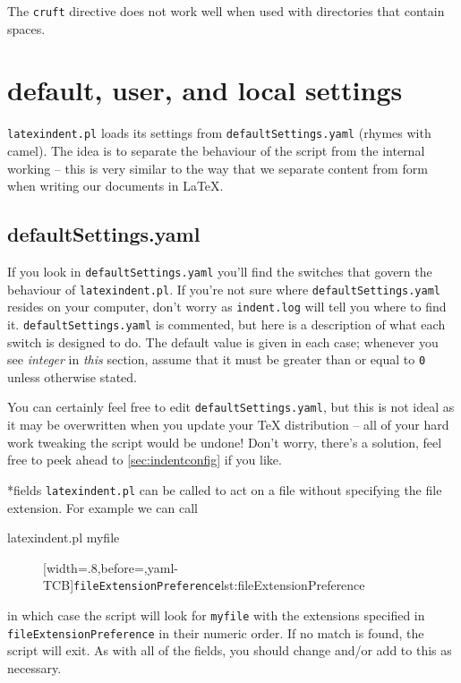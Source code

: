 \documentclass[10pt]{article}
\begin{document}
The \texttt{cruft} directive does not work well when used with
directories that contain spaces.

\section{default, user, and local settings}\label{sec:defuseloc}
\texttt{latexindent.pl} loads its settings from \texttt{defaultSettings.yaml}
(rhymes with camel). The idea is to separate the behaviour of the script
from the internal working -- this is very similar to the way that we separate content
from form when writing our documents in \LaTeX.

\subsection{defaultSettings.yaml}
If you look in \texttt{defaultSettings.yaml} you'll find the switches
that govern the behaviour of \texttt{latexindent.pl}. If you're not sure where
\texttt{defaultSettings.yaml} resides on your computer, don't worry as \texttt{indent.log}
will tell you where to find it.
\texttt{defaultSettings.yaml} is commented,
but here is a description of what each switch is designed to do. The default
value is given in each case; whenever you see \emph{integer} in \emph{this}
section, assume that it must be greater than or equal to \texttt{0} unless
otherwise stated.

You can certainly feel free to edit \texttt{defaultSettings.yaml}, but
this is not ideal as it may be overwritten when you update your \TeX{} distribution --
all of your hard work tweaking the script would be undone! Don't worry,
there's a solution, feel free to peek ahead to \cref{sec:indentconfig} if you like.

*{fields}
\texttt{latexindent.pl} can be called to
act on a file without
specifying the file extension.  For example we can call 
\begin{commandshell}
latexindent.pl myfile
\end{commandshell}
\begin{figure}
[width=.8\linewidth,before=\centering,yaml-TCB]{\texttt{fileExtensionPreference}}{lst:fileExtensionPreference}
\end{figure}

in which case the script will look for \texttt{myfile} with the extensions
specified in \texttt{fileExtensionPreference} in their numeric order. If
no match is found, the script will exit. As with all of the fields, you should
change and/or add to this as necessary.
\end{document}

